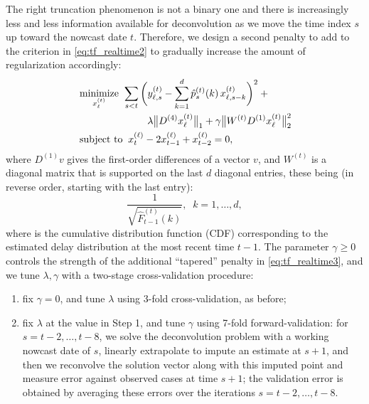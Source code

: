 \documentclass[sts]{imsart}
\newcommand{\minimize}{\mathop{\mathrm{minimize}}}
\newcommand{\subjectto}{\mathop{\mathrm{subject\,\,to}}}
\def\hp{\hat{p}}
\def\hF{\hat{F}}
\theoremstyle{plain}
\theoremstyle{definition}
\theoremstyle{remark}
\begin{document}
The right truncation phenomenon is not a binary one and there is increasingly
less and less information available for deconvolution as we move the time index
$s$ up toward the nowcast date $t$. Therefore, we design a second penalty to add
to the criterion in \eqref{eq:tf_realtime2} to gradually increase the amount of
regularization accordingly:  
\begin{equation}
\label{eq:tf_realtime3}
\begin{alignedat}{2}
&\minimize_{x^{(t)}_\ell} \; && \sum_{s < t} \bigg( y^{(t)}_{\ell,s} -
\sum_{k=1}^d \hp^{(t)}_s(k) \, x^{(t)}_{\ell, s-k} \bigg)^2 +{} \\  
& && \hspace{25pt} \hfill
\lambda \big\|D^{(4)} x^{(t)}_\ell \big\|_1 +
\gamma \big\|W^{(t)} D^{(1)} x^{(t)}_\ell \big\|_2^2 \\ 
&\subjectto && \;\; x^{(\ell)}_t - 2x^{(\ell)}_{t-1} + x^{(\ell)}_{t-2} = 0, 
\end{alignedat}
\end{equation}
where $D^{(1)} v$ gives the first-order differences of a vector $v$, and 
$W^{(t)}$ is a diagonal matrix that is supported on the last $d$ diagonal
entries, these being (in reverse order, starting with the last entry): 
$$
\frac{1}{\sqrt{\hF^{(t)}_{t-1}(k)}}, \;\; k=1,\dots,d, 
$$
where \smash{$\hF^{(t)}_{t-1}$} is the cumulative distribution function (CDF) 
corresponding to the estimated delay distribution \smash{$\hp^{(t)}_{t-1}$} at
the most recent time $t-1$. The parameter $\gamma \geq 0$ controls the
strength of the additional ``tapered'' penalty in \eqref{eq:tf_realtime3}, and
we tune $\lambda,\gamma$ with a two-stage cross-validation procedure: 
\begin{enumerate}
\item fix $\gamma =0$, and tune $\lambda$ using 3-fold cross-validation,
  as before;    
\item fix $\lambda$ at the value in Step 1, and tune $\gamma$ using 
  7-fold forward-validation: for $s= t-2, \ldots, t-8$, we solve the
  deconvolution problem with a working nowcast date of $s$, linearly extrapolate
  to impute an estimate at $s+1$, and then we reconvolve the solution vector
  along with this imputed point and measure error against observed cases at time
  $s+1$; the validation error is obtained by averaging these errors over the
  iterations $s =  t-2, \ldots, t-8$. 
\end{enumerate}
\end{document}
